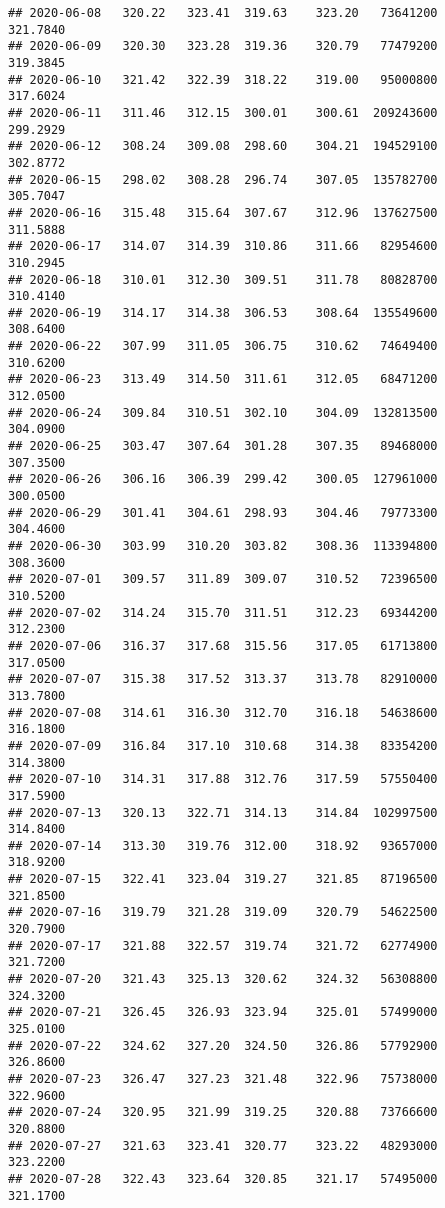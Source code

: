 \documentclass[
]{article}
\begin{document}
\begin{verbatim}
## 2020-06-08   320.22   323.41  319.63    323.20   73641200     321.7840
## 2020-06-09   320.30   323.28  319.36    320.79   77479200     319.3845
## 2020-06-10   321.42   322.39  318.22    319.00   95000800     317.6024
## 2020-06-11   311.46   312.15  300.01    300.61  209243600     299.2929
## 2020-06-12   308.24   309.08  298.60    304.21  194529100     302.8772
## 2020-06-15   298.02   308.28  296.74    307.05  135782700     305.7047
## 2020-06-16   315.48   315.64  307.67    312.96  137627500     311.5888
## 2020-06-17   314.07   314.39  310.86    311.66   82954600     310.2945
## 2020-06-18   310.01   312.30  309.51    311.78   80828700     310.4140
## 2020-06-19   314.17   314.38  306.53    308.64  135549600     308.6400
## 2020-06-22   307.99   311.05  306.75    310.62   74649400     310.6200
## 2020-06-23   313.49   314.50  311.61    312.05   68471200     312.0500
## 2020-06-24   309.84   310.51  302.10    304.09  132813500     304.0900
## 2020-06-25   303.47   307.64  301.28    307.35   89468000     307.3500
## 2020-06-26   306.16   306.39  299.42    300.05  127961000     300.0500
## 2020-06-29   301.41   304.61  298.93    304.46   79773300     304.4600
## 2020-06-30   303.99   310.20  303.82    308.36  113394800     308.3600
## 2020-07-01   309.57   311.89  309.07    310.52   72396500     310.5200
## 2020-07-02   314.24   315.70  311.51    312.23   69344200     312.2300
## 2020-07-06   316.37   317.68  315.56    317.05   61713800     317.0500
## 2020-07-07   315.38   317.52  313.37    313.78   82910000     313.7800
## 2020-07-08   314.61   316.30  312.70    316.18   54638600     316.1800
## 2020-07-09   316.84   317.10  310.68    314.38   83354200     314.3800
## 2020-07-10   314.31   317.88  312.76    317.59   57550400     317.5900
## 2020-07-13   320.13   322.71  314.13    314.84  102997500     314.8400
## 2020-07-14   313.30   319.76  312.00    318.92   93657000     318.9200
## 2020-07-15   322.41   323.04  319.27    321.85   87196500     321.8500
## 2020-07-16   319.79   321.28  319.09    320.79   54622500     320.7900
## 2020-07-17   321.88   322.57  319.74    321.72   62774900     321.7200
## 2020-07-20   321.43   325.13  320.62    324.32   56308800     324.3200
## 2020-07-21   326.45   326.93  323.94    325.01   57499000     325.0100
## 2020-07-22   324.62   327.20  324.50    326.86   57792900     326.8600
## 2020-07-23   326.47   327.23  321.48    322.96   75738000     322.9600
## 2020-07-24   320.95   321.99  319.25    320.88   73766600     320.8800
## 2020-07-27   321.63   323.41  320.77    323.22   48293000     323.2200
## 2020-07-28   322.43   323.64  320.85    321.17   57495000     321.1700

\end{verbatim}
\end{document}
